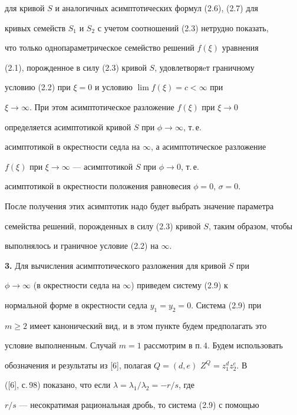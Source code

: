 для кривой $S$ и аналогичных асимптотических формул (2.6), (2.7) для 


кривых семейств $S_1$ и $S_2$ с учетом соотношений (2.3) нетрудно показать,


что только однопараметрическое семейство решений $f(\xi)$ уравнения 


(2.1), порожденное в силу (2.3) кривой $S$, удовлетворяeт граничному 


условию (2.2) при $\xi=0$ и условию $\lim f(\xi)=c<\infty$ при 


$\xi\to\infty$. При этом асимптотическое разложение $f(\xi)$ при $\xi\to0$ 


определяется асимптотикой кривой $S$ при $\phi\to\infty$, т.\,е. 


асимптотикой в окрестности седла на $\infty$, а асимптотическое разложение 


$f(\xi)$ при $\xi\to\infty$ --- асимптотикой $S$ при $\phi\to0$, т.\,е. 


асимптотикой в окрестности положения равновесия $\phi=0$, $\sigma=0$. 


После получения этих асимптотик надо будет выбрать значение параметра 


семейства решений, порожденных в силу (2.3) кривой $S$, таким образом, чтобы 


выполнялось и граничное условие (2.2) на $\infty$. 


\medskip 


\addtocounter{section}{1} 


\setcounter{equation}{0}


 


{\bf 3.} Для вычисления асимптотического разложения для кривой $S$ при 


$\phi\to\infty$ (в окрестности седла на $\infty$) приведем систему (2.9) к 


нормальной форме в окрестности седла $y_1=y_2=0$. Система (2.9) при 


$m\ge2$ имеет канонический вид, и в этом пункте будем предполагать это 


условие выполненным. Случай $m=1$ рассмотрим в п.\,4. Будем использовать 


обозначения и результаты из [6], полагая $Q=(d,e)$ $Z^Q=z^d_1z^e_2$. В 


([6], с.\,98) показано, что если $\lambda=\lambda_1/\lambda_2=-r/s$, где 


$r/s$ --- несократимая рациональная дробь, то система (2.9) с помощью 


